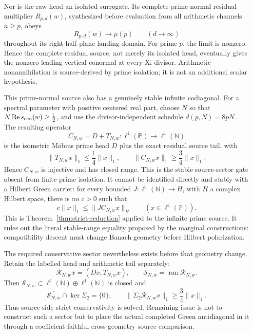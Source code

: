 \documentclass[11pt]{article}
\theoremstyle{definition}
\theoremstyle{remark}
\newcommand{\Rea}{\operatorname{Re}}
\begin{document}
Nor is the raw head an isolated surrogate.  Its complete prime-normal
residual multiplier \(R_{p,d}(w)\), synthesized before evaluation from all
arithmetic channels \(n\ge p\), obeys
\[
                         R_{p,d}(w)\longrightarrow\mu(p)
                         \qquad(d\to\infty)
\tag{3.6fa}\label{eq:prime-isolation}
\]
throughout its right-half-plane landing domain.  For prime \(p\), the limit
is nonzero.  Hence the complete residual source, not merely its isolated
head, eventually gives the nonzero leading vertical conormal at every Xi
divisor.  Arithmetic nonannihilation is source-derived by prime isolation;
it is not an additional scalar hypothesis.

This prime-normal source also has a genuinely stable infinite codiagonal.
For a spectral parameter with positive centered real part, choose \(N\) so
that \(N\Rea s_{\rm cen}(w)\ge\tfrac12\), and use the divisor-independent
schedule \(d(p,N)=8pN\).  The resulting operator
\[
 C_{N,w}=D+T_{N,w}:\ell^1(\mathbb P)
       \longrightarrow\ell^1(\mathbb N)
\]
is the isometric M\"obius prime head \(D\) plus the exact residual source
tail, with
\[
 \|T_{N,w}x\|_1\le\frac14\|x\|_1,\qquad
 \|C_{N,w}x\|_1\ge\frac34\|x\|_1.
\tag{3.6fb}\label{eq:adaptive-prime-codiagonal}
\]
Hence \(C_{N,w}\) is injective and has closed range.  This is the stable
source-sector gate absent from finite prime isolation.  It cannot be
identified directly and stably with a Hilbert Green carrier: for every
bounded \(J:\ell^1(\mathbb N)\to H\), with \(H\) a complex Hilbert space,
there is no \(c>0\) such that
\[
 c\|x\|_1\le\|J C_{N,w}x\|_H
 \qquad(x\in\ell^1(\mathbb P)).
\tag{3.6fc}\label{eq:adaptive-hilbert-no-go}
\]
This is Theorem~\ref{thm:strict-reduction} applied to the infinite prime
source.  It rules out the literal stable-range equality proposed by the
marginal constructions: compatibility descent must change Banach geometry
before Hilbert polarization.

The required conservative sector nevertheless exists before that geometry
change.  Retain the labelled head and arithmetic tail separately:
\[
 \mathcal R_{N,w}x=(Dx,T_{N,w}x),\qquad
 \mathcal S_{N,w}=\operatorname{ran}\mathcal R_{N,w}.
\tag{3.6fd}\label{eq:adaptive-resolved-sector}
\]
Then \(\mathcal S_{N,w}\subset\ell^1(\mathbb N)\oplus
\ell^1(\mathbb N)\) is closed and
\[
 \overline{\mathcal S_{N,w}}\cap\ker\Sigma_2=\{0\},
 \qquad
 \|\Sigma_2\mathcal R_{N,w}x\|_1\ge\frac34\|x\|_1.
\tag{3.6fe}\label{eq:adaptive-resolved-conservative}
\]
Thus source-side strict conservativity is solved.  Remaining issue is not to
construct such a sector but to place the actual completed Green
antidiagonal in it through a coefficient-faithful cross-geometry source
comparison.
\end{document}
